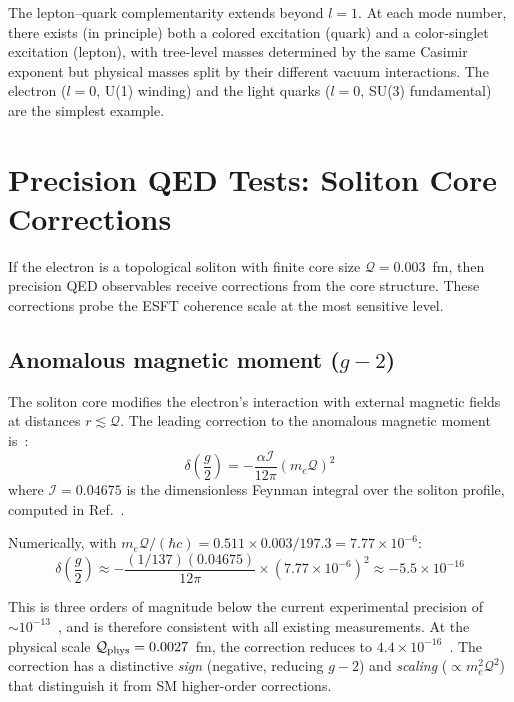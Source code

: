 ﻿\documentclass[twocolumn,preprintnumbers,amsmath,amssymb]{revtex4-2}
\newcommand{\Qoppa}{\mathcal{Q}}
\begin{document}
The lepton--quark complementarity extends beyond $l = 1$. At each mode number, there exists (in principle) both a colored excitation (quark) and a color-singlet excitation (lepton), with tree-level masses determined by the same Casimir exponent but physical masses split by their different vacuum interactions. The electron ($l = 0$, U(1) winding) and the light quarks ($l = 0$, SU(3) fundamental) are the simplest example.

\section{Precision QED Tests: Soliton Core Corrections}
\label{sec:precision}

If the electron is a topological soliton with finite core size $\Qoppa = 0.003$~fm, then precision QED observables receive corrections from the core structure. These corrections probe the ESFT coherence scale at the most sensitive level.

\subsection{Anomalous magnetic moment ($g{-}2$)}

The soliton core modifies the electron's interaction with external magnetic fields at distances $r \lesssim \Qoppa$. The leading correction to the anomalous magnetic moment is~\cite{Paper1}:
\begin{equation}
\delta\!\left(\frac{g}{2}\right) = -\frac{\alpha \mathcal{I}}{12\pi}(m_e \Qoppa)^2
\label{eq:g2}
\end{equation}
where $\mathcal{I} = 0.04675$ is the dimensionless Feynman integral over the soliton profile, computed in Ref.~\cite{Paper1}.

Numerically, with $m_e \Qoppa/(\hbar c) = 0.511 \times 0.003/197.3 = 7.77 \times 10^{-6}$:
\begin{equation}
\delta\!\left(\frac{g}{2}\right) \approx -\frac{(1/137)(0.04675)}{12\pi}\times (7.77 \times 10^{-6})^2 \approx -5.5 \times 10^{-16}
\end{equation}

This is three orders of magnitude below the current experimental precision of $\sim 10^{-13}$~\cite{Fan2023}, and is therefore consistent with all existing measurements. At the physical scale $\Qoppa_{\rm phys} = 0.0027$~fm, the correction reduces to $4.4 \times 10^{-16}$~\cite{Paper1}. The correction has a distinctive \emph{sign} (negative, reducing $g{-}2$) and \emph{scaling} ($\propto m_e^2 \Qoppa^2$) that distinguish it from SM higher-order corrections.
\end{document}
